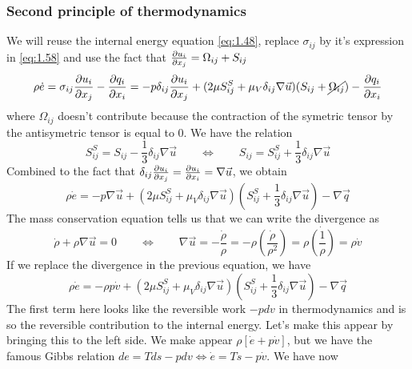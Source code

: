 		\subsubsection{Second principle of thermodynamics}
			We will reuse the internal energy equation \eqref{eq:1.48}, replace $\sigma _{ij}$ by it's expression in \eqref{eq:1.58} and use the fact that $\frac{\D u_i}{\D x_j} = \Omega _{ij} + S_{ij}$
			\begin{equation}
				\rho \dot{e} = \sigma _{ij} \frac{\D u_i}{\D x_j} - \frac{\D q_i}{\D x_i} = -p \delta _{ij} \frac{\D u_i}{\D x_j} + (2\mu S_{ij}^S + \mu _V \delta _{ij} \nabla \vec{u})(S_{ij}+\cancel{\Omega _{ij}}) - \frac{\D q_i}{\D x_i}
			\end{equation}
			where $\Omega _{ij}$ doesn't contribute because the contraction of the symetric tensor by the antisymetric tensor is equal to 0.  We have the relation 
			\begin{equation}
			S_{ij}^S = S_{ij}-\frac{1}{3}\delta _{ij}\nabla \vec{u} \qquad \Leftrightarrow \qquad S_{ij} = S_{ij}^S + \frac{1}{3}\delta _{ij}\nabla \vec{u}
	  		\end{equation}
	  		Combined to the fact that $\delta _{ij} \frac{\D u_i}{\D x_j} = \frac{\D u_i}{\D x_i} = \nabla \vec{u}$, we obtain
	  		\begin{equation}
	  			\rho \dot{e} = -p \nabla \vec{u} + (2\mu S_{ij}^S + \mu _V \delta _{ij} \nabla \vec{u})\left( S_{ij}^S + \frac{1}{3}\delta _{ij}\nabla \vec{u}\right) - \nabla \vec{q}
	  		\end{equation}
	  		The mass conservation equation tells us that we can write the divergence as 
	  		\begin{equation}
	  			\dot{\rho} + \rho \nabla \vec{u} = 0 \qquad \Leftrightarrow \qquad \nabla \vec{u} = -\frac{\dot{\rho}}{\rho} = -\rho \left( \frac{\dot{\rho}}{\rho ^2}\right) = \rho \dot{\left( \frac{1}{\rho}\right)} = \rho \dot{v}
	  		\end{equation}
	  		If we replace the divergence in the previous equation, we have
	  		\begin{equation}
	  			\rho \dot{e} = -\rho p \dot{v} + (2\mu S_{ij}^S + \mu _V \delta _{ij} \nabla \vec{u})\left(S_{ij}^S + \frac{1}{3}\delta _{ij}\nabla \vec{u}\right) - \nabla \vec{q}
	  		\end{equation}
	  		The first term here looks like the reversible work $-pdv$ in thermodynamics and is so the reversible contribution to the internal energy. Let's make this appear by bringing this to the left side. We make appear $\rho [\dot{e} + p\dot{v}]$, but we have the famous Gibbs relation $de = Tds - pdv \Leftrightarrow \dot{e} = T\dot{s}-p\dot{v}$. We have now 
